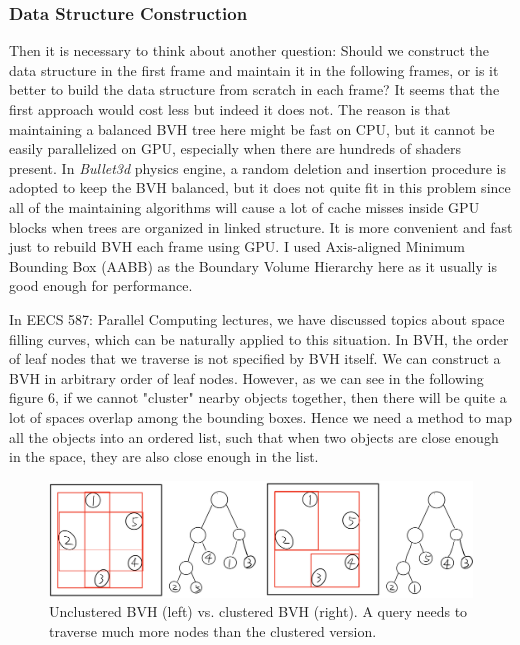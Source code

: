 \documentclass[11pt]{article}
\begin{document}
\subsubsection{Data Structure Construction}
\label{sec:orgf732fa3}
Then it is necessary to think about another question: Should we construct the data structure in the first frame and maintain it in the following frames, or is it better to build the data structure from scratch in each frame? It seems that the first approach would cost less but indeed it does not. The reason is that maintaining a balanced BVH tree here might be fast on CPU, but it cannot be easily parallelized on GPU, especially when there are hundreds of shaders present. In \emph{Bullet3d} physics engine, a random deletion and insertion procedure is adopted to keep the BVH balanced, but it does not quite fit in this problem since all of the maintaining algorithms will cause a lot of cache misses inside GPU blocks when trees are organized in linked structure. It is more convenient and fast just to rebuild BVH each frame using GPU. I used Axis-aligned Minimum Bounding Box (AABB) as the Boundary Volume Hierarchy here as it usually is good enough for performance.

In EECS 587: Parallel Computing lectures, we have discussed topics about space filling curves, which can be naturally applied to this situation. In BVH, the order of leaf nodes that we traverse is not specified by BVH itself. We can construct a BVH in arbitrary order of leaf nodes. However, as we can see in the following figure 6, if we cannot "cluster" nearby objects together, then there will be quite a lot of spaces overlap among the bounding boxes. Hence we need a method to map all the objects into an ordered list, such that when two objects are close enough in the space, they are also close enough in the list.

\begin{figure}[htbp]
\centering
\includegraphics[width=.9\linewidth]{./rep_6.png}
\caption{Unclustered BVH (left) vs. clustered BVH (right). A query needs to traverse much more nodes than the clustered version.}
\end{figure}
\end{document}

